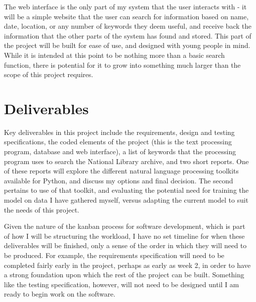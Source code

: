 \documentclass{article}
\begin{document}
The web interface is the only part of my system that the user interacts with - it will be a simple website that the user can search for information based on name, date, location, or any number of keywords they deem useful, and receive back the information that the other parts of the system has found and stored. This part of the project will be built for ease of use, and designed with young people in mind. While it is intended at this point to be nothing more than a basic search function, there is potential for it to grow into something much larger than the scope of this project requires. 

\section{Deliverables}
Key deliverables in this project include the requirements, design and testing specifications, the coded elements of the project (this is the text processing program, database and web interface), a list of keywords that the processing program uses to search the National Library archive, and two short reports. One of these reports will explore the different natural language processing toolkits available for Python, and discuss my options and final decision. The second pertains to use of that toolkit, and evaluating the potential need for training the model on data I have gathered myself, versus adapting the current model to suit the needs of this project. 

Given the nature of the kanban process for software development, which is part of how I will be structuring the workload, I have no set timeline for when these deliverables will be finished, only a sense of the order in which they will need to be produced. For example, the requirements specification will need to be completed fairly early in the project, perhaps as early as week 2, in order to have a strong foundation upon which the rest of the project can be built. Something like the testing specification, however, will not need to be designed until I am ready to begin work on the software. 
\end{document}
